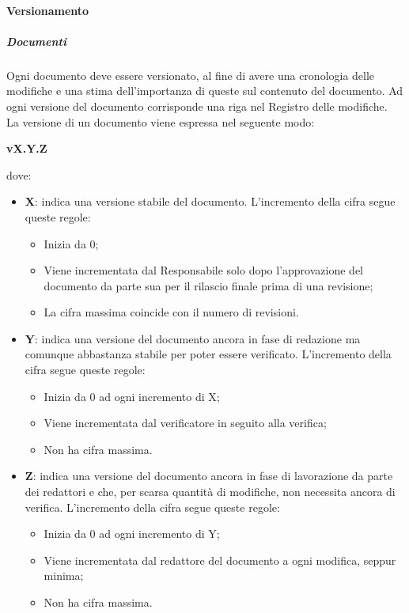 \documentclass[../norme-di-progetto.tex]{subfiles}
\begin{document}
\paragraph{Versionamento}
\subparagraph{Documenti}
Ogni documento deve essere versionato, al fine di avere una cronologia delle modifiche e una stima dell'importanza di queste sul contenuto del documento. Ad ogni versione del documento corrisponde una riga nel Registro delle modifiche. \\
La versione di un documento viene espressa nel seguente modo: \\ \begin{center}
  \centering
  \textbf{vX.Y.Z}
\end{center} dove:
\begin{itemize}
  \item \textbf{X}: indica una versione stabile del documento. L'incremento della cifra segue queste regole:
  \begin{itemize}
    \item Inizia da 0;
    \item Viene incrementata dal Responsabile solo dopo l'approvazione del documento da parte sua per il rilascio finale prima di una revisione;
    \item La cifra massima coincide con il numero di revisioni.
  \end{itemize}
  \item \textbf{Y}: indica una versione del documento ancora in fase di redazione ma comunque abbastanza stabile per poter essere verificato. L'incremento della cifra segue queste regole:
  \begin{itemize}
    \item Inizia da 0 ad ogni incremento di X;
    \item Viene incrementata dal verificatore in seguito alla verifica;
    \item Non ha cifra massima.
  \end{itemize}
  \item \textbf{Z}: indica una versione del documento ancora in fase di lavorazione da parte dei redattori e che, per scarsa quantità di modifiche, non necessita ancora di verifica. L'incremento della cifra segue queste regole:
  \begin{itemize}
    \item Inizia da 0 ad ogni incremento di Y;
    \item Viene incrementata dal redattore del documento a ogni modifica, seppur minima;
    \item Non ha cifra massima.
  \end{itemize}
\end{itemize}
\end{document}
